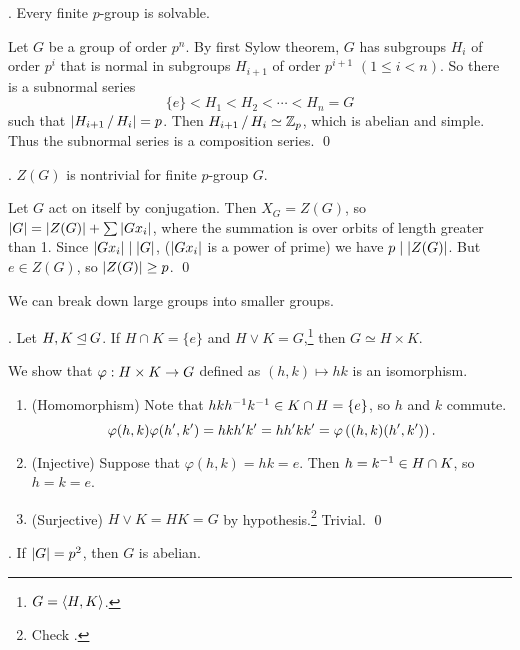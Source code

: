 
\thm. Every finite \(p\)-group is solvable.

\pf Let \(G\) be a group of order \(p^n\). By first Sylow theorem, \(G\) has subgroups \(H_i\) of order \(p^i\) that is normal in subgroups \(H_{i+1}\) of order \(p^{i+1}\) \((1 \leq i < n)\). So there is a subnormal series
\[
    \{e\} < H_1 < H_2 < \cdots < H_n = G
\]
such that \(\left| H_{i+1} \operatorname{/} H_i \right| = p\). Then \(H_{i+1} \operatorname{/} H_i \simeq \mathbb{Z}_p\), which is abelian and simple. Thus the subnormal series is a composition series. \qed

\thm. \(Z(G)\) is nontrivial for finite \(p\)-group \(G\).

\pf Let \(G\) act on itself by conjugation. Then \(X_G = Z(G)\), so \(\left| G \right| = \left| Z(G) \right| + \sum \left| Gx_i \right|\), where the summation is over orbits of length greater than 1. Since \(\left| Gx_i \right| \mid \left| G \right|\), (\(\left| Gx_i \right|\) is a power of prime) we have \(p \mid \left| Z(G) \right|\). But \(e \in Z(G)\), so \(\left| Z(G) \right| \geq p\). \qed

We can break down large groups into smaller groups.

\lemma. Let \(H, K \unlhd G\). If \(H \cap K = \{e\}\) and \(H \vee K = G\),\footnote{\(G = \left\langle H, K \right\rangle\).} then \(G \simeq H \times K\).

\pf We show that \(\varphi : H \times K \rightarrow G\) defined as \((h, k) \mapsto hk\) is an isomorphism.
\begin{enumerate}
    \item (Homomorphism) Note that \(hkh^{-1} k^{-1} \in K \cap H = \{e\}\), so \(h\) and \(k\) commute.
    \[
        \varphi(h, k) \varphi(h', k') = hkh'k' = hh'kk' = \varphi\left( (h, k)(h', k') \right).
    \]
    \item (Injective) Suppose that \(\varphi(h, k) = hk = e\). Then \(h = k^{-1} \in H\cap K\), so \(h = k = e\).
    \item (Surjective) \(H \vee K = HK = G\) by hypothesis.\footnote{Check .} Trivial. \qed
\end{enumerate}

\thm. If \(\left| G \right| = p^2\), then \(G\) is abelian.

